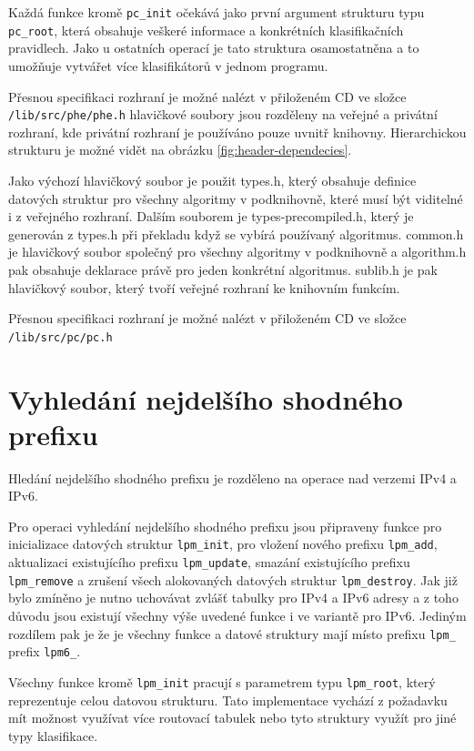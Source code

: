 Každá funkce kromě \texttt{pc\_init} očekává jako první argument strukturu typu \texttt{pc\_root},
která obsahuje veškeré informace a konkrétních klasifikačních pravidlech. Jako u ostatních operací
je tato struktura osamostatněna a to umožňuje vytvářet více klasifikátorů v jednom programu.

Přesnou specifikaci rozhraní je možné nalézt v přiloženém CD ve složce \texttt{/lib/src/phe/phe.h}
hlavičkové soubory jsou rozděleny na veřejné a privátní rozhraní, kde privátní rozhraní je používáno pouze uvnitř knihovny. Hierarchickou strukturu je možné vidět na obrázku \ref{fig:header-dependecies}.

Jako výchozí hlavičkový soubor je použit types.h, který obsahuje definice datových struktur pro všechny algoritmy v podknihovně, které musí být viditelné i z veřejného rozhraní. Dalším souborem je types-precompiled.h, který je generován z types.h při překladu když se vybírá používaný algoritmus. common.h je hlavičkový soubor společný pro všechny algoritmy v podknihovně a algorithm.h pak obsahuje deklarace právě pro jeden konkrétní algoritmus.
sublib.h je pak hlavičkový soubor, který tvoří veřejné rozhraní ke knihovním funkcím.

Přesnou specifikaci rozhraní je možné nalézt v přiloženém CD ve složce \texttt{/lib/src/pc/pc.h}


\section{Vyhledání nejdelšího shodného prefixu}

Hledání nejdelšího shodného prefixu je rozděleno na operace nad verzemi IPv4 a IPv6.

Pro operaci vyhledání nejdelšího shodného prefixu jsou připraveny funkce pro inicializace datových struktur
\texttt{lpm\_init}, pro vložení nového prefixu \texttt{lpm\_add}, aktualizaci existujícího prefixu
\texttt{lpm\_update}, smazání existujícího prefixu \texttt{lpm\_remove} a zrušení všech alokovaných
datových struktur \texttt{lpm\_destroy}. Jak již bylo zmíněno je nutno uchovávat zvlášť tabulky
pro IPv4 a IPv6 adresy a z toho důvodu jsou existují všechny výše uvedené funkce i ve variantě
pro IPv6. Jediným rozdílem pak je že je všechny funkce a datové struktury mají místo prefixu
\texttt{lpm\_} prefix \texttt{lpm6\_}.

Všechny funkce kromě \texttt{lpm\_init} pracují s parametrem typu \texttt{lpm\_root}, který reprezentuje
celou datovou strukturu. Tato implementace vychází z požadavku mít možnost využívat více routovací
tabulek nebo tyto struktury využít pro jiné typy klasifikace.

